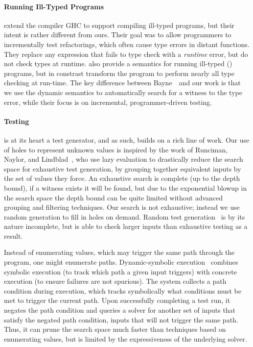 \paragraph{Running Ill-Typed Programs}
\label{sec:nanomaly:running-ill-typed}
\citet{Vytiniotis2012-gh} extend the \haskell
compiler GHC to support compiling ill-typed programs, but their intent
is rather different from ours. Their goal was to allow programmers to
incrementally test refactorings, which often cause type errors in
distant functions. They replace any expression that fails to type
check with a \emph{runtime} error, but do not check types
at runtime.
%
\citet{Bayne2011-cn} also provide a semantics for running
ill-typed (\java) programs, but in constrast transform the program to
perform nearly all type checking at run-time. The key difference between
Bayne~\etal\ and our work is that we use the dynamic semantics to
automatically search for a witness to the type error, while their focus
is on incremental, programmer-driven testing.

\paragraph{Testing}\label{sec:nanomaly:testing}
%
\nanomaly is at its heart a test generator, and as such,
builds on a rich line of work.
%
Our use of holes to represent unknown values is inspired by the work of
Runciman, Naylor, and Lindblad~\cite{Runciman2008-ka,Naylor2007-mi,Lindblad2007-oy},
%
who use lazy evaluation to drastically reduce the search space for
exhaustive test generation, by grouping together equivalent inputs by
the set of values they force. An exhaustive search is complete (up to
the depth bound), if a witness exists it will be found, but due to the
exponential blowup in the search space the depth bound can be quite
limited without advanced grouping and filtering techniques.
%
Our search is not exhaustive; instead we use random generation to fill
in holes on demand.
%
Random test generation~\cite{Claessen2000-lj,Csallner2004-bf,Pacheco2007-at}
%
is by its nature incomplete, but is able to check larger inputs than
exhaustive testing as a result.

Instead of enumerating values, which may trigger the same path through
the program, one might enumerate paths.
%
Dynamic-symbolic execution~\cite{Godefroid2005-am,Cadar2008-kg,Tillmann2008-qc}
%
combines symbolic execution (to track which path a given input triggers)
with concrete execution (to ensure failures are not spurious). The
system collects a path condition during execution, which tracks
symbolically what conditions must be met to trigger the current
path. Upon successfully completing a test run, it negates the path
condition and queries a solver for another set of inputs that satisfy
the negated path condition, \ie inputs that will not trigger the same
path. Thus, it can prune the search space much faster than techniques
based on enumerating values, but is limited by the expressiveness of the
underlying solver.

